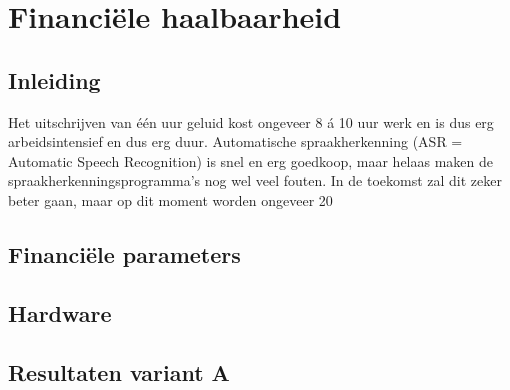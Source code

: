 \chapter{Financiële haalbaarheid}

\begin{center}
  \begin{minipage}{0.5\textwidth}
    \begin{small}
    \end{small}
  \end{minipage}
  \vspace{0.5cm}
\end{center}

\section{Inleiding}

Het uitschrijven van één uur geluid kost ongeveer 8 á 10 uur werk en is dus erg arbeidsintensief en dus erg duur. Automatische spraakherkenning (ASR = Automatic Speech Recognition) is snel en erg goedkoop, maar helaas maken de spraakherkenningsprogramma’s nog wel veel fouten. In de toekomst zal dit zeker beter gaan, maar op dit moment worden ongeveer 20%

\section{Financiële parameters}

\section{Hardware}

\section{Resultaten variant A}

